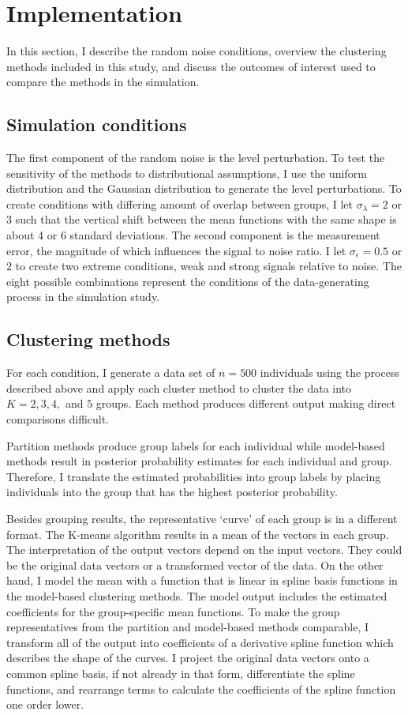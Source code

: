 \section{Implementation}
In this section, I describe the random noise conditions, overview the clustering methods included in this study, and discuss the outcomes of interest used to compare the methods in the simulation. 

\subsection{Simulation conditions}
The first component of the random noise is the level perturbation.  To test the sensitivity of the methods to distributional assumptions, I use the uniform distribution and the Gaussian distribution to generate the level perturbations. To create conditions with differing amount of overlap between groups, I let $\sigma_{\lambda}=2$ or $3$ such that the vertical shift between the mean functions with the same shape is about 4 or 6 standard deviations. The second component is the measurement error, the magnitude of which influences the signal to noise ratio. I let $\sigma_{\epsilon}=0.5$ or $2$ to create two extreme conditions, weak and strong signals relative to noise. The eight possible combinations represent the conditions of the data-generating process in the simulation study. 

\subsection{Clustering methods}
For each condition, I generate a data set of $n=500$ individuals using the process described above and apply each cluster method to cluster the data into $K=2,3,4,$ and $5$ groups. Each method produces different output making direct comparisons difficult. 

Partition methods produce group labels for each individual while model-based methods result in posterior probability estimates for each individual and group. Therefore, I translate the estimated probabilities into group labels by placing individuals into the group that has the highest posterior probability.

Besides grouping results, the representative `curve' of each group is in a different format. The K-means algorithm results in a mean of the vectors in each group. The interpretation of the output vectors depend on the input vectors. They could be the original data vectors or a transformed vector of the data. On the other hand, I model the mean with a function that is linear in spline basis functions in the model-based clustering methods. The model output includes the estimated coefficients for the group-specific mean functions. To make the group representatives from the partition and model-based methods comparable, I transform all of the output into coefficients of a derivative spline function which describes the shape of the curves. I project the original data vectors onto a common spline basis, if not already in that form, differentiate the spline functions, and rearrange terms to calculate the coefficients of the spline function one order lower. 

